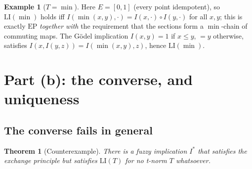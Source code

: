 \documentclass{amsart}
\newtheorem{theorem}{Theorem}
\theoremstyle{definition}
\newtheorem{example}{Example}
\theoremstyle{remark}
\newcommand{\zo}{[0,1]}
\newcommand{\LI}{\mathrm{LI}}
\newcommand{\EP}{\mathrm{EP}}
\begin{document}
\begin{example}[$T=\min$]\label{ex:min}
Here $E=\zo$ (every point idempotent), so $\LI(\min)$ holds iff
$I(\min(x,y),\cdot)=I(x,\cdot)\circ I(y,\cdot)$ for all $x,y$; this is exactly $\EP$
\emph{together with} the requirement that the sections form a $\min$-chain of commuting
maps. The G\"odel implication $I(x,y)=1$ if $x\le y$, $=y$ otherwise, satisfies
$I(x,I(y,z))=I(\min(x,y),z)$, hence $\LI(\min)$.
\end{example}

\section{Part (b): the converse, and uniqueness}

\subsection{The converse fails in general}

\begin{theorem}[Counterexample]\label{thm:counter}
There is a fuzzy implication $I^{\ast}$ that satisfies the exchange principle but satisfies
$\LI(T)$ for no t-norm $T$ whatsoever.
\end{theorem}
\end{document}
